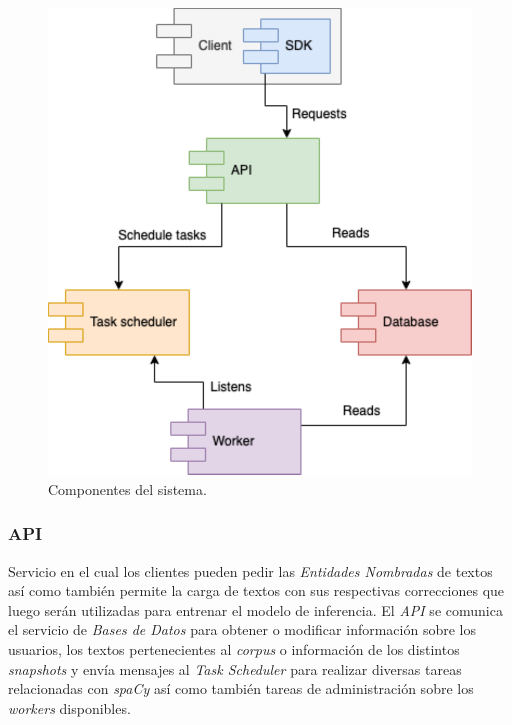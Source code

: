 \documentclass[12pt,a4paper,]{scrartcl}
\begin{document}
\begin{figure}[H]

{\centering \includegraphics{assets/process/process-overview-client.pdf} 

}

\caption{Componentes del sistema.}\label{fig:process-overview-client}
\end{figure}

\hypertarget{api-1}{%
\subsubsection{API}\label{api-1}}

Servicio en el cual los clientes pueden pedir las \emph{Entidades Nombradas} de textos así como también permite la carga de textos con sus respectivas correcciones que luego serán utilizadas para entrenar el modelo de inferencia.
El \emph{API} se comunica el servicio de \emph{Bases de Datos} para obtener o modificar información sobre los usuarios, los textos pertenecientes al \emph{corpus} o información de los distintos \emph{snapshots} y envía mensajes al \emph{Task Scheduler} para realizar diversas tareas relacionadas con \emph{spaCy} así como también tareas de administración sobre los \emph{workers} disponibles.
\end{document}
